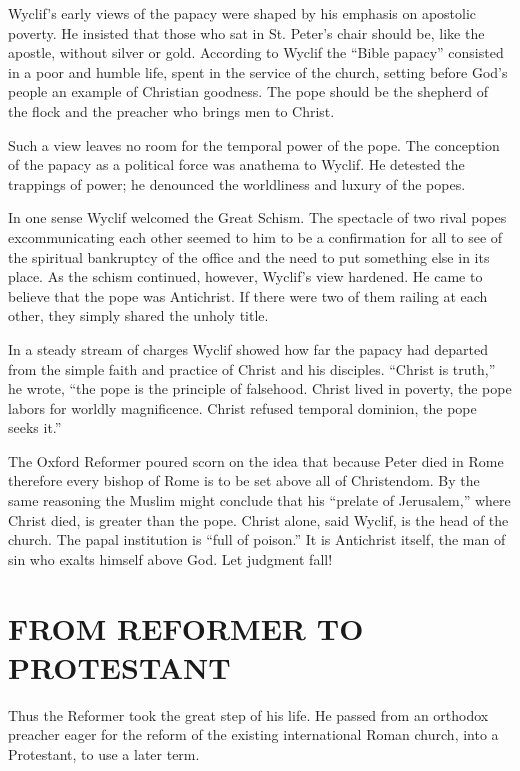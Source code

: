 Wyclif’s early views of the papacy were shaped by his emphasis on apostolic poverty. He insisted
that those who sat in St. Peter’s chair should be, like the apostle, without silver or gold.
According to Wyclif the “Bible papacy” consisted in a poor and humble life, spent in the service of
the church, setting before God’s people an example of Christian goodness. The pope should be the
shepherd of the flock and the preacher who brings men to Christ.

Such a view leaves no room for the temporal power of the pope. The conception of the papacy as a
political force was anathema to Wyclif. He detested the trappings of power; he denounced the
worldliness and luxury of the popes.

In one sense Wyclif welcomed the Great Schism. The spectacle of two rival popes excommunicating each
other seemed to him to be a confirmation for all to see of the spiritual bankruptcy of the office
and the need to put something else in its place. As the schism continued, however, Wyclif’s view
hardened. He came to believe that the pope was Antichrist. If there were two of them railing at each
other, they simply shared the unholy title.

In a steady stream of charges Wyclif showed how far the papacy had departed from the simple faith
and practice of Christ and his disciples. “Christ is truth,” he wrote, “the pope is the principle of
falsehood. Christ lived in poverty, the pope labors for worldly magnificence. Christ refused
temporal dominion, the pope seeks it.”

The Oxford Reformer poured scorn on the idea that because Peter died in Rome therefore every bishop
of Rome is to be set above all of Christendom. By the same reasoning the Muslim might conclude that
his “prelate of Jerusalem,” where Christ died, is greater than the pope. Christ alone, said Wyclif,
is the head of the church. The papal institution is “full of poison.” It is Antichrist itself, the
man of sin who exalts himself above God. Let judgment fall!

\section{FROM REFORMER TO PROTESTANT}

Thus the Reformer took the great step of his life. He passed from an orthodox preacher eager for the
reform of the existing international Roman church, into a Protestant, to use a later term.

